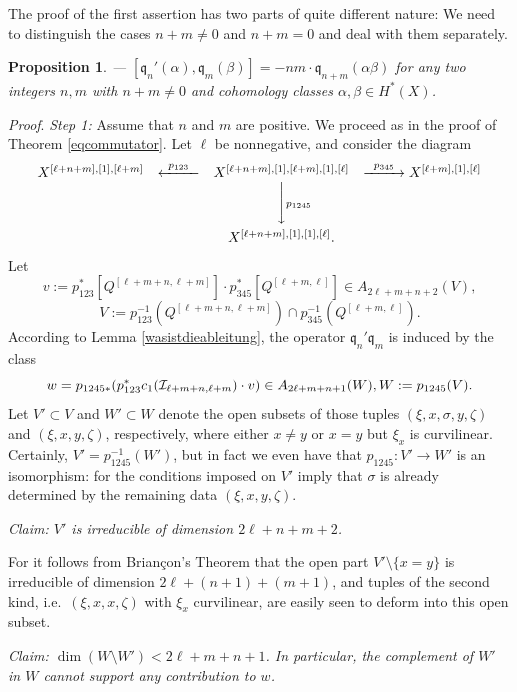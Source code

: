 \documentclass[twoside,11pt]{article}
\newtheorem{proposition}[theorem]{Proposition}
\newcommand{\prf}{{\kursiv Proof}. }
\newcommand{\kursiv}{\sl}
\newcommand{\ki}{{\cal I}}
\newcommand{\gothq}{{\mathfrak q}}
\newcommand{\qq}{\gothq}
\newcommand{\verylongrightarrow}[1]{\raisebox{0mm}[0.9ex][0ex]{\hbox to #1{\rightarrowfill}}}
\newcommand{\verylongleftarrow}[1]{\raisebox{0mm}[0.9ex][0ex]{\hbox to #1{\leftarrowfill}}}
\begin{document}
The proof of the first assertion has two parts of quite different nature:
We need to distinguish the cases $n+m\neq0$ and $n+m=0$ and deal with them
separately.

\begin{proposition}\label{easycase}--- $[\qq_n'(\alpha),\qq_m(\beta)]=-nm\cdot\qq_{n+m}(\alpha\beta)$ for any
two integers $n,m$ with $n+m\neq0$ and cohomology classes $\alpha,\beta
\in H^*(X)$.
\end{proposition}



\prf {\em Step 1:} Assume that $n$ and $m$ are positive.
We proceed as in the proof of Theorem \ref{eqcommutator}. Let $\ell$ be
nonnegative, and consider the diagram
$$\begin{array}{ccccc}
X^{[\ell+n+m],[1],[\ell+m]}&\stackrel{p_{123}}{\verylongleftarrow{3em}}&
X^{[\ell+n+m],[1],[\ell+m],[1],[\ell]}&
\stackrel{p_{345}}{\verylongrightarrow{3em}} X^{[\ell+m],[1],[\ell]} \\
&&\phantom{\scriptstyle p_{1245}}\Bigg\downarrow
{\scriptstyle p_{1245}}\\[3ex]
&&X^{[\ell+n+m],[1],[1],[\ell]}.
\end{array}$$
Let 
$$v:=p_{123}^*[Q^{[\ell+m+n,\ell+m]}]\cdot p_{345}^*[Q^{[\ell+m,\ell]}]\in
A_{2\ell+m+n+2}(V),$$
{}$$V:=p_{123}^{-1}(Q^{[\ell+m+n,\ell+m]})\cap 
p_{345}^{-1}(Q^{[\ell+m,\ell]}).$$
According to Lemma \ref{wasistdieableitung}, the operator $\qq_n'\qq_m$
is induced by the class
$$w=p_{1245*}(p_{123}^*c_1(\ki_{\ell+m+n,\ell+m})\cdot v)\in A_{2\ell+m+n+1}(W), W:=p_{1245}(V).$$
Let $V'\subset V$ and $W'\subset W$ denote the open subsets of those tuples
$(\xi,x,\sigma,y,\zeta)$ and $(\xi,x,y,\zeta)$, respectively, where either
$x\neq y$ or $x=y$ but $\xi_x$ is curvilinear. Certainly, $V'=p_{1245}^{-1}(W')$, but in fact we even have that 
$p_{1245}:V'\to W'$ is an isomorphism: for the conditions imposed on $V'$ imply
that $\sigma$ is already determined by the remaining data $(\xi,x,y,\zeta)$.


{\em Claim: $V'$ is irreducible of dimension $2\ell+n+m+2$.}

For it follows from Brian\c{c}on's Theorem that the open part $V'\setminus\{x=y\}$ is irreducible of dimension $2\ell+(n+1)+(m+1)$, and
tuples of the second kind, i.e.\ $(\xi,x,x,\zeta)$ with $\xi_x$ curvilinear,
are easily seen to deform into this open subset.

{\em Claim: $\dim(W\setminus W')<2\ell+m+n+1$. In particular, the complement
of $W'$ in $W$ cannot support any contribution to $w$.}
\end{document}
